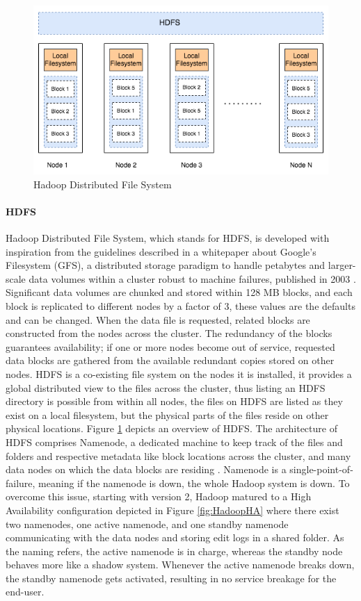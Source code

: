 \documentclass[review]{elsarticle}
\begin{document}
\begin{figure}[h!]
	\caption{Hadoop Distributed File System}
	\label{fig:HDFSoverview}
	\includegraphics[width=\textwidth]{HDFSoverview}
	\centering
\end{figure}

\paragraph{HDFS}Hadoop Distributed File System, which stands for HDFS, is developed with inspiration from the guidelines described in a whitepaper about Google's Filesystem (GFS), a distributed storage paradigm to handle petabytes and larger-scale data volumes within a cluster robust to machine failures, published in 2003 \cite{ghemawat_google_2003}. Significant data volumes are chunked and stored within 128 MB blocks, and each block is replicated to different nodes by a factor of 3, these values are the defaults and can be changed. When the data file is requested, related blocks are constructed from the nodes across the cluster. The redundancy of the blocks guarantees availability; if one or more nodes become out of service, requested data blocks are gathered from the available redundant copies stored on other nodes. HDFS is a co-existing file system on the nodes it is installed, it provides a global distributed view to the files across the cluster, thus listing an HDFS directory is possible from within all nodes, the files on HDFS are listed as they exist on a local filesystem, but the physical parts of the files reside on other physical locations. Figure \ref{fig:HDFSoverview} depicts an overview of HDFS. The architecture of HDFS comprises Namenode, a dedicated machine to keep track of the files and folders and respective metadata like block locations across the cluster, and many data nodes on which the data blocks are residing \cite{white_hadoop_2015}. Namenode is a single-point-of-failure, meaning if the namenode is down, the whole Hadoop system is down. To overcome this issue, starting with version 2, Hadoop matured to a High Availability configuration depicted in Figure \ref{fig:HadoopHA} where there exist two namenodes, one active namenode, and one standby namenode communicating with the data nodes and storing edit logs in a shared folder. As the naming refers, the active namenode is in charge, whereas the standby node behaves more like a shadow system. Whenever the active namenode breaks down, the standby namenode gets activated, resulting in no service breakage for the end-user.
\end{document}
